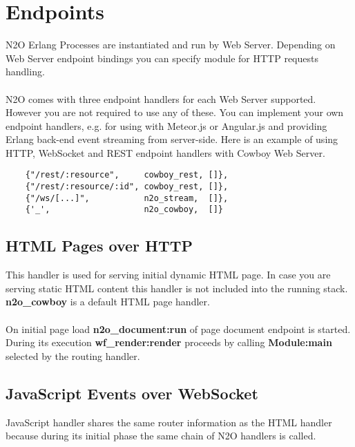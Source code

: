 \section{Endpoints}
N2O Erlang Processes are instantiated and run by Web Server.
Depending on Web Server endpoint bindings you can specify
module for HTTP requests handling.

\paragraph{}
N2O comes with three endpoint handlers for each Web Server supported.
However you are not required to use any of these.
You can implement your own endpoint handlers, e.g. for using with
Meteor.js or Angular.js and providing Erlang back-end event streaming
from server-side. Here is an example of using HTTP, WebSocket and
REST endpoint handlers with Cowboy Web Server.

\vspace{1\baselineskip}
\begin{lstlisting}
    {"/rest/:resource",     cowboy_rest, []},
    {"/rest/:resource/:id", cowboy_rest, []},
    {"/ws/[...]",           n2o_stream,  []},
    {'_',                   n2o_cowboy,  []}
\end{lstlisting}

\subsection{HTML Pages over HTTP}
This handler is used for serving initial dynamic HTML page.
In case you are serving static HTML content this handler is
not included into the running stack. {\bf {n2o}\_{cowboy}} is
a default HTML page handler.

\paragraph{}
On initial page load {\bf {n2o}\_{document}:run} of page document endpoint is started.
During its execution {\bf {wf}\_{render}:render} proceeds
by calling {\bf Module:main} selected by the routing handler.

\newpage
\subsection{JavaScript Events over WebSocket}
JavaScript handler shares the same router information as the
HTML handler because during its initial phase the same chain
of N2O handlers is called.


